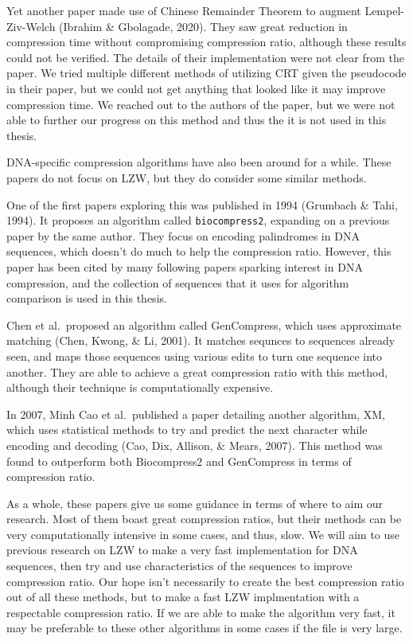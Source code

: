 \documentclass[12pt,twoside]{reedthesis}
\begin{document}
Yet another paper made use of Chinese Remainder Theorem to augment Lempel-Ziv-Welch (Ibrahim \& Gbolagade, 2020). They saw great reduction in compression time without compromising compression ratio, although these results could not be verified. The details of their implementation were not clear from the paper. We tried multiple different methods of utilizing CRT given the pseudocode in their paper, but we could not get anything that looked like it may improve compression time. We reached out to the authors of the paper, but we were not able to further our progress on this method and thus the it is not used in this thesis.

DNA-specific compression algorithms have also been around for a while. These papers do not focus on LZW, but they do consider some similar methods.

One of the first papers exploring this was published in 1994 (Grumbach \& Tahi, 1994). It proposes an algorithm called \texttt{biocompress2}, expanding on a previous paper by the same author. They focus on encoding palindromes in DNA sequences, which doesn't do much to help the compression ratio. However, this paper has been cited by many following papers sparking interest in DNA compression, and the collection of sequences that it uses for algorithm comparison is used in this thesis.

Chen et al.~proposed an algorithm called GenCompress, which uses approximate matching (Chen, Kwong, \& Li, 2001). It matches sequnces to sequences already seen, and maps those sequences using various edits to turn one sequence into another. They are able to achieve a great compression ratio with this method, although their technique is computationally expensive.

In 2007, Minh Cao et al.~published a paper detailing another algorithm, XM, which uses statistical methods to try and predict the next character while encoding and decoding (Cao, Dix, Allison, \& Mears, 2007). This method was found to outperform both Biocompress2 and GenCompress in terms of compression ratio.

As a whole, these papers give us some guidance in terms of where to aim our research. Most of them boast great compression ratios, but their methods can be very computationally intensive in some cases, and thus, slow. We will aim to use previous research on LZW to make a very fast implementation for DNA sequences, then try and use characteristics of the sequences to improve compression ratio. Our hope isn't necessarily to create the best compression ratio out of all these methods, but to make a fast LZW implmentation with a respectable compression ratio. If we are able to make the algorithm very fast, it may be preferable to these other algorithms in some cases if the file is very large.
\end{document}
